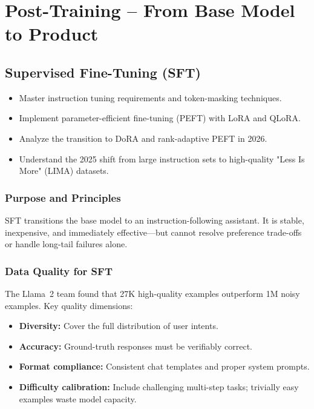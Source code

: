 \part{Post-Training -- From Base Model to Product}

\chapter{Supervised Fine-Tuning (SFT)}
\minitoc

\begin{chapteroverview}
  \begin{itemize}
    \item Master instruction tuning requirements and token-masking techniques.
    \item Implement parameter-efficient fine-tuning (PEFT) with LoRA and QLoRA.
    \item Analyze the transition to DoRA and rank-adaptive PEFT in 2026.
    \item Understand the 2025 shift from large instruction sets to high-quality "Less Is More" (LIMA) datasets.
  \end{itemize}
\end{chapteroverview}

\section{Purpose and Principles}

SFT transitions the base model to an instruction-following assistant. It is stable, inexpensive, and immediately effective---but cannot resolve preference trade-offs or handle long-tail failures alone.

\section{Data Quality for SFT}

The Llama~2 team \parencite{touvron2023llama} found that 27K high-quality examples outperform 1M noisy examples. Key quality dimensions:
\begin{itemize}
  \item \textbf{Diversity:} Cover the full distribution of user intents.
  \item \textbf{Accuracy:} Ground-truth responses must be verifiably correct.
  \item \textbf{Format compliance:} Consistent chat templates and proper system prompts.
  \item \textbf{Difficulty calibration:} Include challenging multi-step tasks; trivially easy examples waste model capacity.
\end{itemize}

